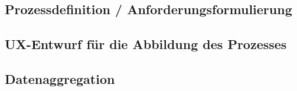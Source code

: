 \subsection{Prozessdefinition / Anforderungsformulierung}

\subsection{UX-Entwurf für die Abbildung des Prozesses}

\subsection{Datenaggregation}
